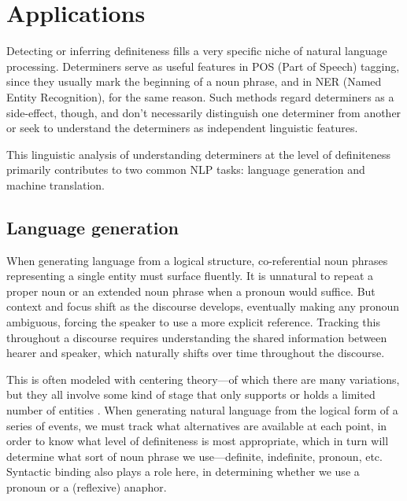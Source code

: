 \documentclass[11pt]{article}\usepackage{graphicx, color}
\begin{document}
\section{Applications}
Detecting or inferring definiteness fills a very specific niche of natural language processing. Determiners serve as useful features in POS (Part of Speech) tagging, since they usually mark the beginning of a noun phrase, and in NER (Named Entity Recognition), for the same reason. Such methods regard determiners as a side-effect, though, and don't necessarily distinguish one determiner from another or seek to understand the determiners as independent linguistic features.

This linguistic analysis of understanding determiners at the level of definiteness primarily contributes to two common NLP tasks: language generation and machine translation.



\subsection{Language generation}
When generating language from a logical structure, co-referential noun phrases representing a single entity must surface fluently. It is unnatural to repeat a proper noun or an extended noun phrase when a pronoun would suffice. But context and focus shift as the discourse develops, eventually making any pronoun ambiguous, forcing the speaker to use a more explicit reference. Tracking this throughout a discourse requires understanding the shared information between hearer and speaker, which naturally shifts over time throughout the discourse.

This is often modeled with centering theory---of which there are many variations, but they all involve some kind of stage that only supports or holds a limited number of entities \citep{brennan:1987, grosz:1995, beaver:2000}. When generating natural language from the logical form of a series of events, we must track what alternatives are available at each point, in order to know what level of definiteness is most appropriate, which in turn will determine what sort of noun phrase we use---definite, indefinite, pronoun, etc. Syntactic binding also plays a role here, in determining whether we use a pronoun or a (reflexive) anaphor.
\end{document}
